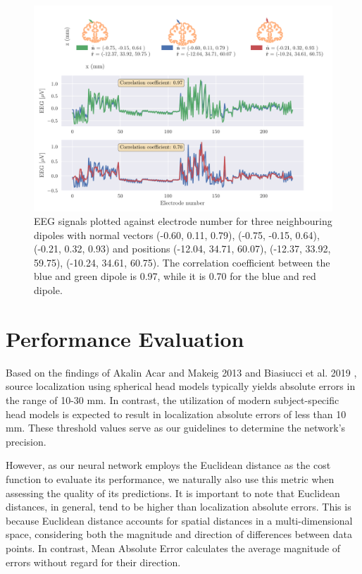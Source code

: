 \documentclass[a4paper, UKenglish, 11pt]{uiomaster}
\begin{document}
\begin{figure}[!htb]
    \centering
    \includegraphics[width=\linewidth]{figures/compare_dipoles.pdf}
    \caption{EEG signals plotted against electrode number for three neighbouring dipoles with normal vectors (-0.60, 0.11, 0.79), (-0.75, -0.15, 0.64), (-0.21, 0.32, 0.93) and positions (-12.04, 34.71, 60.07), (-12.37, 33.92, 59.75), (-10.24, 34.61, 60.75). The correlation coefficient between the blue and green dipole is 0.97, while it is 0.70 for the blue and red dipole. }
    \label{fig:neighbour_dipoles}
\end{figure}

\FloatBarrier

\section{Performance Evaluation}
Based on the findings of Akalin Acar and Makeig 2013 \cite{akalinacar2013} and Biasiucci et al. 2019 \cite{michel2019}, source localization using spherical head models typically yields absolute errors in the range of 10-30 mm. In contrast, the utilization of modern subject-specific head models is expected to result in localization absolute errors of less than 10 mm. These threshold values serve as our guidelines to determine the network's precision.

However, as our neural network employs the Euclidean distance as the cost function to evaluate its performance, we naturally also use this metric when assessing the quality of its predictions. It is important to note that Euclidean distances, in general, tend to be higher than localization absolute errors. This is because Euclidean distance accounts for spatial distances in a multi-dimensional space, considering both the magnitude and direction of differences between data points. In contrast, Mean Absolute Error calculates the average magnitude of errors without regard for their direction.
\end{document}
